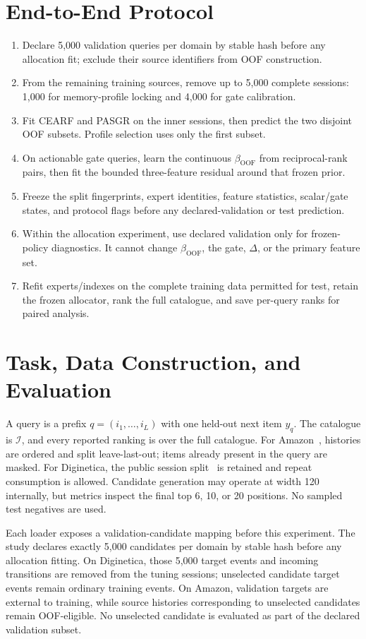 \documentclass[runningheads]{llncs}
\begin{document}
\section{End-to-End Protocol}
\begin{enumerate}
\item Declare 5,000 validation queries per domain by stable hash before any
allocation fit; exclude their source identifiers from OOF construction.
\item From the remaining training sources, remove up to 5,000 complete
sessions: 1,000 for memory-profile locking and 4,000 for gate calibration.
\item Fit CEARF and PASGR on the inner sessions, then predict the two disjoint
OOF subsets. Profile selection uses only the first subset.
\item On actionable gate queries, learn the continuous
$\beta_{\mathrm{OOF}}$ from reciprocal-rank pairs, then fit the bounded
three-feature residual around that frozen prior.
\item Freeze the split fingerprints, expert identities, feature statistics,
scalar/gate states, and protocol flags before any declared-validation or test
prediction.
\item Within the allocation experiment, use declared validation only for
frozen-policy diagnostics. It cannot
change $\beta_{\mathrm{OOF}}$, the gate, $\Delta$, or the primary feature set.
\item Refit experts/indexes on the complete training data permitted for test,
retain the frozen allocator, rank the full catalogue, and save per-query ranks
for paired analysis.
\end{enumerate}

\section{Task, Data Construction, and Evaluation}
A query is a prefix $q=(i_1,\ldots,i_L)$ with one held-out next item $y_q$.
The catalogue is $\mathcal I$, and every reported ranking is over the full
catalogue. For Amazon~\cite{hou2024amazonreviews}, histories are ordered and split leave-last-out; items
already present in the query are masked. For Diginetica, the public session
split~\cite{diginetica2016} is retained and repeat consumption is allowed. Candidate generation may
operate at width 120 internally, but metrics inspect the final top 6, 10, or
20 positions. No sampled test negatives are used.

Each loader exposes a validation-candidate mapping before this experiment.
The study declares exactly 5,000 candidates per domain by stable hash before
any allocation fitting. On Diginetica, those 5,000 target events and incoming
transitions are removed from the tuning sessions; unselected candidate target
events remain ordinary training events. On Amazon, validation targets are
external to training, while source histories corresponding to unselected
candidates remain OOF-eligible. No unselected candidate is evaluated as part
of the declared validation subset.
\end{document}
